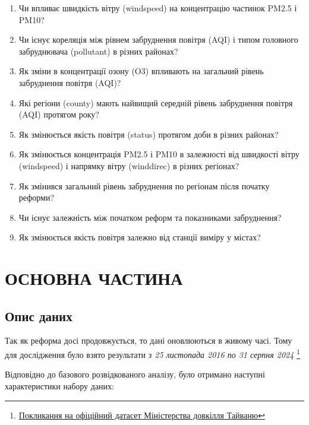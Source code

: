 \documentclass{article}
\begin{document}
\begin{enumerate}
    \item Чи впливає швидкість вітру (windspeed) на концентрацію частинок PM2.5 і PM10?
    \item Чи існує кореляція між рівнем забруднення повітря (AQI) і типом головного забруднювача (pollutant) в різних районах?
    \item Як зміни в концентрації озону (O3) впливають на загальний рівень забруднення повітря (AQI)?
    \item Які регіони (county) мають найвищий середній рівень забруднення повітря (AQI) протягом року?
    \item Як змінюється якість повітря (status) протягом доби в різних районах?
    \item Як змінюється концентрація PM2.5 і PM10 в залежності від швидкості вітру (windspeed) і напрямку вітру (winddirec) в різних регіонах?
    \item Як змінився загальний рівень забруднення по регіонам після початку реформи? 
    \item Чи існує залежність між початком реформ та показниками забруднення? 
    \item Як змінюється якість повітря залежно від станції виміру у містах?
\end{enumerate}

    
\newpage
\section{ОСНОВНА ЧАСТИНА}
\subsection{Опис даних}
Так як реформа досі продовжується, то дані оновлюються в живому часі. Тому для дослідження було взято результати \textit{з 25 листопада 2016 по 31 серпня 2024}
\footnote{\href{https://data.moenv.gov.tw/en/dataset/detail/aqx_p_488}{Покликання на офіційний датасет Міністерства довкілля Тайваню}}

Відповідно до базового розвідкованого аналізу, було отримано наступні характеристики набору даних: 
\end{document}
